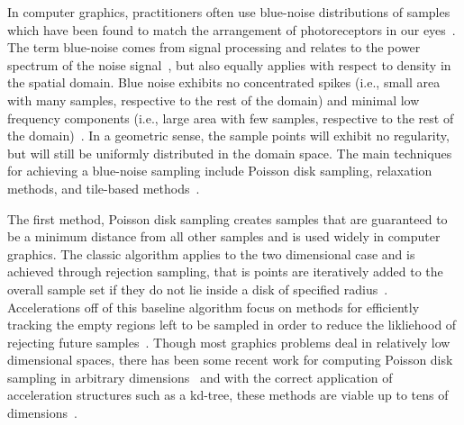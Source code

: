 In computer graphics, practitioners often use blue-noise distributions of samples which have been found to match the arrangement of photoreceptors in our eyes~\cite{Yellott1982}.
%
The term blue-noise comes from signal processing and relates to the power spectrum of the noise signal~\cite{Tuzlukov2002}, but also equally applies with respect to density in the spatial domain.
%
Blue noise exhibits no concentrated spikes (i.e., small area with many samples, respective to the rest of the domain) and minimal low frequency components (i.e., large area with few samples, respective to the rest of the domain)~\cite{YanGuoWang2015}.
%
In a geometric sense, the sample points will exhibit no regularity, but will still be uniformly distributed in the domain space.
%
The main techniques for achieving a blue-noise sampling include Poisson disk sampling, relaxation methods, and tile-based methods~\cite{YanGuoWang2015}.

The first method, Poisson disk sampling creates samples that are guaranteed to be a minimum distance from all other samples and is used widely in computer graphics.
%
The classic algorithm applies to the two dimensional case and is achieved through rejection sampling, that is points are iteratively added to the overall sample set if they do not lie inside a disk of specified radius~\cite{Cook1986}.
%
Accelerations off of this baseline algorithm focus on methods for efficiently tracking the empty regions left to be sampled in order to reduce the likliehood of rejecting future samples~\cite{EbeidaDavidsonPatney2011,EbeidaMitchellPatney2012,GamitoMaddock2009,Jones2006,JonesKarger2011,WhiteClineEgbert2007}.
%
Though most graphics problems deal in relatively low dimensional spaces, there has been some recent work for computing Poisson disk sampling in arbitrary dimensions~\cite{Bridson2007,EbeidaMitchellPatney2012,EbeidaMitchellPatney2015,GamitoMaddock2009,MitchellEbeidaAwad2018} and with the correct application of acceleration structures such as a kd-tree, these methods are viable up to tens of dimensions~\cite{MitchellEbeidaAwad2018}.

